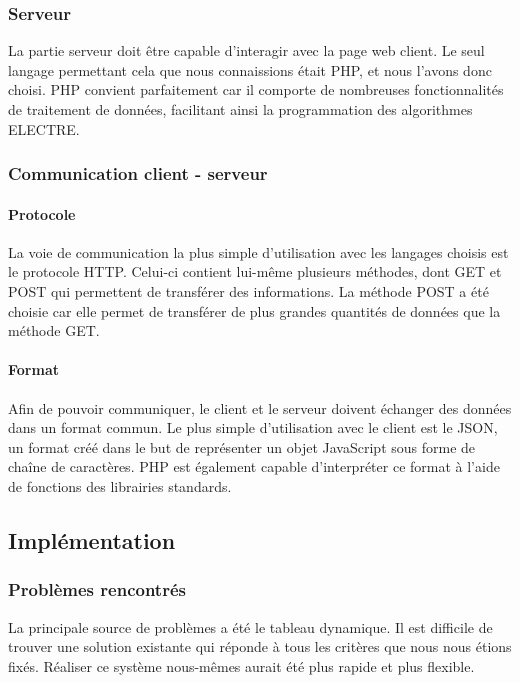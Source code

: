 \documentclass[a4paper]{article}
\begin{document}
\subsubsection{Serveur}

La partie serveur doit être capable d'interagir avec la page web client. Le seul langage permettant cela que nous connaissions était PHP, et nous l'avons donc choisi. PHP convient parfaitement car il comporte de nombreuses fonctionnalités de traitement de données, facilitant ainsi la programmation des algorithmes ELECTRE.

\subsubsection{Communication client - serveur}

\paragraph{Protocole} La voie de communication la plus simple d'utilisation avec les langages choisis est le protocole HTTP. Celui-ci contient lui-même plusieurs méthodes, dont GET et POST qui permettent de transférer des informations. La méthode POST a été choisie car elle permet de transférer de plus grandes quantités de données que la méthode GET.

\paragraph{Format} Afin de pouvoir communiquer, le client et le serveur doivent échanger des données dans un format commun. Le plus simple d'utilisation avec le client est le JSON, un format créé dans le but de représenter un objet JavaScript sous forme de chaîne de caractères. PHP est également capable d'interpréter ce format à l'aide de fonctions des librairies standards. 

\newpage

\subsection{Implémentation}

\subsubsection{Problèmes rencontrés}

La principale source de problèmes a été le tableau dynamique. Il est difficile de trouver une solution existante qui réponde à tous les critères que nous nous étions fixés. Réaliser ce système nous-mêmes aurait été plus rapide et plus flexible.
\end{document}
